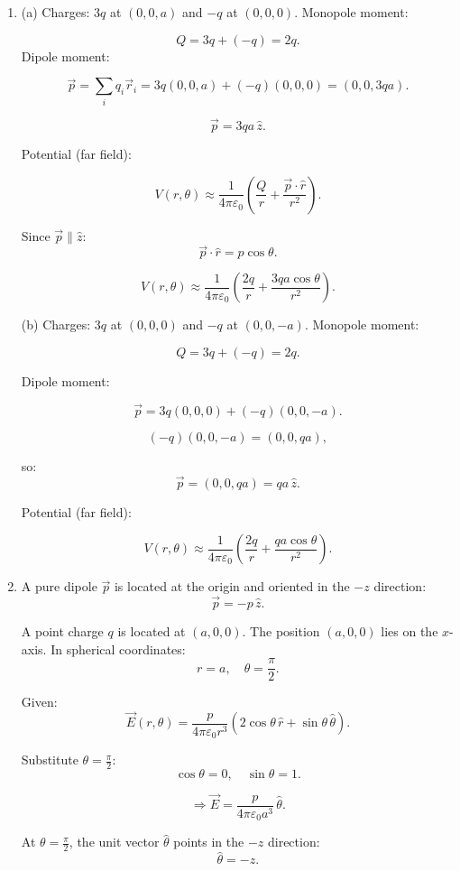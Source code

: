 \documentclass[12pt]{article}
\begin{document}
\begin{enumerate}
\item 

(a) Charges: $3q$ at $(0,0,a)$ and $-q$ at $(0,0,0)$. Monopole moment:

\[
Q = 3q + (-q) = 2q.
\]
Dipole moment:

\[
\vec{p} = \sum_i q_i \vec{r}_i = 3q(0,0,a) + (-q)(0,0,0) = (0,0,3qa).
\]

\[
\vec{p} = 3qa\,\hat{z}.
\]

Potential (far field):

\[
V(r,\theta) \approx \frac{1}{4\pi\varepsilon_0}
\left(
\frac{Q}{r} + \frac{\vec{p}\cdot \hat{r}}{r^2}
\right).
\]

Since $\vec{p}\parallel \hat{z}$:
\[
\vec{p}\cdot \hat{r} = p\cos\theta.
\]

\[
V(r,\theta) \approx \frac{1}{4\pi\varepsilon_0}
\left(
\frac{2q}{r} + \frac{3qa\cos\theta}{r^2}
\right).
\]

(b) Charges: $3q$ at $(0,0,0)$ and $-q$ at $(0,0,-a)$. Monopole moment:

\[
Q = 3q + (-q) = 2q.
\]

Dipole moment:

\[
\vec{p} = 3q(0,0,0) + (-q)(0,0,-a).
\]

\[
(-q)(0,0,-a) = (0,0,qa),
\]

so:
\[
\vec{p} = (0,0,qa) = qa\,\hat{z}.
\]

Potential (far field):

\[
V(r,\theta) \approx \frac{1}{4\pi\varepsilon_0}
\left(
\frac{2q}{r} + \frac{qa\cos\theta}{r^2}
\right).
\]



\item A pure dipole $\vec{p}$ is located at the origin and oriented in the $-z$ direction:
\[
\vec{p} = -p\,\hat{z}.
\]

A point charge $q$ is located at $(a,0,0)$. The position $(a,0,0)$ lies on the $x$-axis. In spherical coordinates:
\[
r = a, \quad \theta = \frac{\pi}{2}.
\]

Given:
\[
\vec{E}(r,\theta) = \frac{p}{4\pi\varepsilon_0 r^3}
\left( 2\cos\theta\,\hat{r} + \sin\theta\,\hat{\theta} \right).
\]

Substitute $\theta = \frac{\pi}{2}$:
\[
\cos\theta = 0, \quad \sin\theta = 1.
\]

\[
\Rightarrow \vec{E} = \frac{p}{4\pi\varepsilon_0 a^3}\,\hat{\theta}.
\]

At $\theta = \frac{\pi}{2}$, the unit vector $\hat{\theta}$ points in the $-z$ direction:
\[
\hat{\theta} = -\hat{z}.
\]


\end{enumerate}
\end{document}
